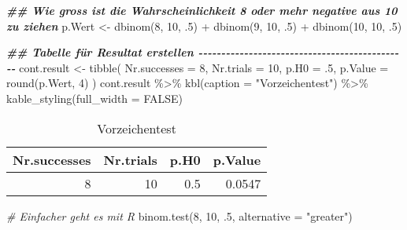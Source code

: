 \documentclass[
]{book}
\newenvironment{Shaded}{\begin{snugshade}}{\end{snugshade}}
\newcommand{\AttributeTok}[1]{\textcolor[rgb]{0.77,0.63,0.00}{#1}}
\newcommand{\CommentTok}[1]{\textcolor[rgb]{0.56,0.35,0.01}{\textit{#1}}}
\newcommand{\ConstantTok}[1]{\textcolor[rgb]{0.00,0.00,0.00}{#1}}
\newcommand{\DecValTok}[1]{\textcolor[rgb]{0.00,0.00,0.81}{#1}}
\newcommand{\DocumentationTok}[1]{\textcolor[rgb]{0.56,0.35,0.01}{\textbf{\textit{#1}}}}
\newcommand{\FunctionTok}[1]{\textcolor[rgb]{0.00,0.00,0.00}{#1}}
\newcommand{\NormalTok}[1]{#1}
\newcommand{\OtherTok}[1]{\textcolor[rgb]{0.56,0.35,0.01}{#1}}
\newcommand{\SpecialCharTok}[1]{\textcolor[rgb]{0.00,0.00,0.00}{#1}}
\newcommand{\StringTok}[1]{\textcolor[rgb]{0.31,0.60,0.02}{#1}}
\begin{document}
\begin{Shaded}
\begin{Highlighting}[]
\DocumentationTok{\#\# Wie gross ist die Wahrscheinlichkeit 8 oder mehr negative aus 10 zu ziehen  }
\NormalTok{p.Wert }\OtherTok{\textless{}{-}} \FunctionTok{dbinom}\NormalTok{(}\DecValTok{8}\NormalTok{, }\DecValTok{10}\NormalTok{, .}\DecValTok{5}\NormalTok{) }\SpecialCharTok{+} \FunctionTok{dbinom}\NormalTok{(}\DecValTok{9}\NormalTok{, }\DecValTok{10}\NormalTok{, .}\DecValTok{5}\NormalTok{) }\SpecialCharTok{+} \FunctionTok{dbinom}\NormalTok{(}\DecValTok{10}\NormalTok{, }\DecValTok{10}\NormalTok{, .}\DecValTok{5}\NormalTok{)}


\DocumentationTok{\#\# Tabelle für Resultat erstellen {-}{-}{-}{-}{-}{-}{-}{-}{-}{-}{-}{-}{-}{-}{-}{-}{-}{-}{-}{-}{-}{-}{-}{-}{-}{-}{-}{-}{-}{-}{-}{-}{-}{-}{-}{-}{-}{-}{-}{-}{-}{-}{-}{-}{-}{-}}
\NormalTok{cont.result }\OtherTok{\textless{}{-}} \FunctionTok{tibble}\NormalTok{(}
  \AttributeTok{Nr.successes =} \DecValTok{8}\NormalTok{,}
  \AttributeTok{Nr.trials =} \DecValTok{10}\NormalTok{, }
  \AttributeTok{p.H0 =}\NormalTok{ .}\DecValTok{5}\NormalTok{,}
  \AttributeTok{p.Value =} \FunctionTok{round}\NormalTok{(p.Wert, }\DecValTok{4}\NormalTok{)}
\NormalTok{)}
\NormalTok{cont.result }\SpecialCharTok{\%\textgreater{}\%} 
  \FunctionTok{kbl}\NormalTok{(}\AttributeTok{caption =} \StringTok{"Vorzeichentest"}\NormalTok{) }\SpecialCharTok{\%\textgreater{}\%} 
  \FunctionTok{kable\_styling}\NormalTok{(}\AttributeTok{full\_width =} \ConstantTok{FALSE}\NormalTok{)}
\end{Highlighting}
\end{Shaded}

\begin{table}

\caption{\label{tab:unnamed-chunk-28}Vorzeichentest}
\centering
\begin{tabular}[t]{r|r|r|r}
\hline
Nr.successes & Nr.trials & p.H0 & p.Value\\
\hline
8 & 10 & 0.5 & 0.0547\\
\hline
\end{tabular}
\end{table}

\begin{Shaded}
\begin{Highlighting}[]
\CommentTok{\# Einfacher geht es mit R }
\FunctionTok{binom.test}\NormalTok{(}\DecValTok{8}\NormalTok{, }\DecValTok{10}\NormalTok{, .}\DecValTok{5}\NormalTok{, }\AttributeTok{alternative =} \StringTok{"greater"}\NormalTok{)}
\end{Highlighting}
\end{Shaded}
\end{document}

